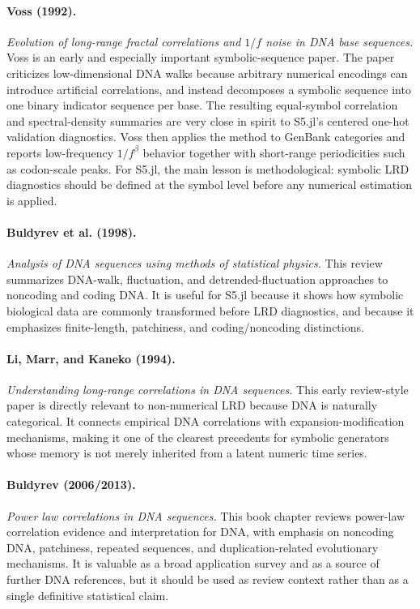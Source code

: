 \documentclass[11pt]{article}
\begin{document}
\paragraph{Voss (1992).}
\emph{Evolution of long-range fractal correlations and $1/f$ noise in DNA base
sequences.}
Voss is an early and especially important symbolic-sequence paper. The paper
criticizes low-dimensional DNA walks because arbitrary numerical encodings can
introduce artificial correlations, and instead decomposes a symbolic sequence
into one binary indicator sequence per base. The resulting equal-symbol
correlation and spectral-density summaries are very close in spirit to S5.jl's
centered one-hot validation diagnostics. Voss then applies the method to
GenBank categories and reports low-frequency $1/f^\beta$ behavior together
with short-range periodicities such as codon-scale peaks. For S5.jl, the main
lesson is methodological: symbolic LRD diagnostics should be defined at the
symbol level before any numerical estimation is applied.

\paragraph{Buldyrev et al. (1998).}
\emph{Analysis of DNA sequences using methods of statistical physics.}
This review summarizes DNA-walk, fluctuation, and detrended-fluctuation
approaches to noncoding and coding DNA. It is useful for S5.jl because it shows
how symbolic biological data are commonly transformed before LRD diagnostics,
and because it emphasizes finite-length, patchiness, and coding/noncoding
distinctions.

\paragraph{Li, Marr, and Kaneko (1994).}
\emph{Understanding long-range correlations in DNA sequences.}
This early review-style paper is directly relevant to non-numerical LRD because
DNA is naturally categorical. It connects empirical DNA correlations with
expansion-modification mechanisms, making it one of the clearest precedents for
symbolic generators whose memory is not merely inherited from a latent numeric
time series.

\paragraph{Buldyrev (2006/2013).}
\emph{Power law correlations in DNA sequences.}
This book chapter reviews power-law correlation evidence and interpretation for
DNA, with emphasis on noncoding DNA, patchiness, repeated sequences, and
duplication-related evolutionary mechanisms. It is valuable as a broad
application survey and as a source of further DNA references, but it should be
used as review context rather than as a single definitive statistical claim.
\end{document}
